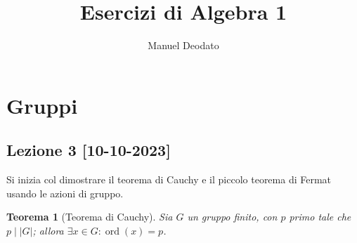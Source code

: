 \documentclass[11pt]{scrartcl}
\title{Esercizi di Algebra 1}
\author{Manuel Deodato}
\date{}
\theoremstyle{style}
\newtheorem{teorema}{Teorema}[section]
\renewcommand{\maketitle}{
\begin{center}
{\sffamily
{\fontsize{20}{20}\selectfont\MakeUppercase{\thetitle}}}

\vspace{0.2in}

{\large\MakeUppercase{\theauthor}}
\end{center}
}
\numberwithin{equation}{subsection}
\begin{document}
\maketitle
\newpage
\tableofcontents
\newpage
\section{Gruppi}
\subsection{Lezione 3 [10-10-2023]}
Si inizia col dimostrare il teorema di Cauchy e il piccolo teorema di Fermat usando le azioni di gruppo.
\begin{teorema}
	[Teorema di Cauchy]
	Sia $G$ un gruppo finito, con $p$ primo tale che $p  \mid \lvert G \rvert $; allora $\exists x \in G : \operatorname{ord}(x) =p$.
\end{teorema}
\end{document}
